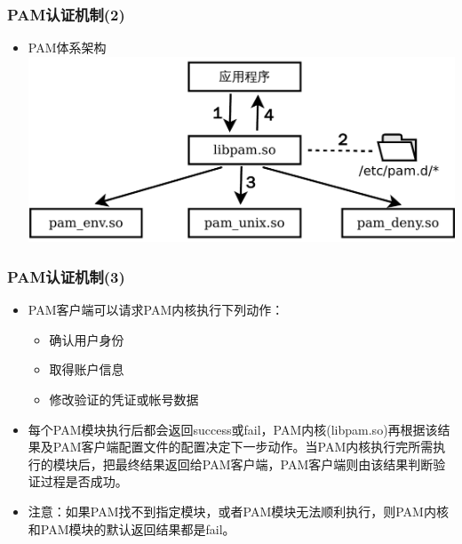 \documentclass[xcolor=svgnames,presentation]{beamer}
\begin{document}
\begin{frame}
\frametitle{PAM认证机制(2)}
\label{sec-6-3}
\begin{itemize}

\item PAM体系架构\\
\label{sec-6-3-1}%
\includegraphics[width=.9\linewidth]{img/pam4.pdf}
\end{itemize} %
\end{frame}
\begin{frame}
\frametitle{PAM认证机制(3)}
\label{sec-6-4}
\begin{itemize}

\item PAM客户端可以请求PAM内核执行下列动作：
\label{sec-6-4-1}%
\begin{itemize}

\item 确认用户身份
\label{sec-6-4-1-1}%

\item 取得账户信息
\label{sec-6-4-1-2}%

\item 修改验证的凭证或帐号数据
\label{sec-6-4-1-3}%
\end{itemize} %

\item 每个PAM模块执行后都会返回success或fail，PAM内核(libpam.so)再根据该结果及PAM客户端配置文件的配置决定下一步动作。当PAM内核执行完所需执行的模块后，把最终结果返回给PAM客户端，PAM客户端则由该结果判断验证过程是否成功。
\label{sec-6-4-2}%

\item 注意：如果PAM找不到指定模块，或者PAM模块无法顺利执行，则PAM内核和PAM模块的默认返回结果都是fail。
\label{sec-6-4-3}%
\end{itemize} %
\end{frame}
\end{document}
